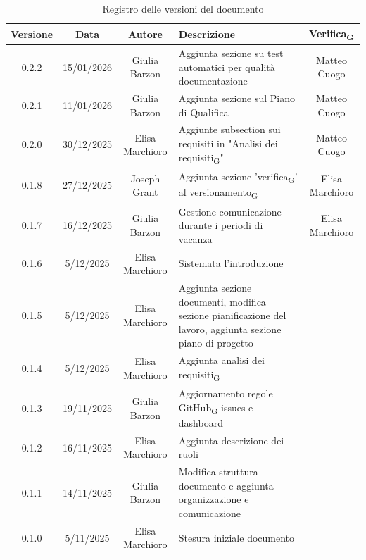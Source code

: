 \documentclass[11pt,a4paper]{article}
\newcommand{\gls}[1]{#1\textsubscript{G}}
\begin{document}
\begin{table}[H]
    \centering
    \begin{tabular}{|c|c|c|>{\raggedright\arraybackslash}p{}|c|}
        \hline
        \textbf{Versione} & \textbf{Data} & \textbf{Autore} & \textbf{Descrizione} & \textbf{\gls{Verifica}} \\
        \hline
        0.2.2 & 15/01/2026 & Giulia Barzon & Aggiunta sezione su test automatici per qualità documentazione & Matteo Cuogo\\
        \hline
        0.2.1 & 11/01/2026 & Giulia Barzon & Aggiunta sezione sul Piano di Qualifica & Matteo Cuogo\\
        \hline
        0.2.0 & 30/12/2025 & Elisa Marchioro & Aggiunte subsection sui requisiti in "\gls{Analisi dei requisiti}" & Matteo Cuogo\\ 
        \hline
        0.1.8 & 27/12/2025 & Joseph Grant & Aggiunta sezione '\gls{verifica}' al \gls{versionamento} & Elisa Marchioro\\ 
        \hline
        0.1.7 & 16/12/2025 & Giulia Barzon & Gestione comunicazione durante i periodi di vacanza & Elisa Marchioro\\
        \hline
        0.1.6 & 5/12/2025 & Elisa Marchioro & Sistemata l'introduzione & \\
        \hline
        0.1.5 & 5/12/2025 & Elisa Marchioro & Aggiunta sezione documenti, modifica sezione pianificazione del lavoro, aggiunta sezione piano di progetto & \\
        \hline
        0.1.4 & 5/12/2025 & Elisa Marchioro & Aggiunta \gls{analisi dei requisiti} & \\
        \hline
        0.1.3 & 19/11/2025 & Giulia Barzon & Aggiornamento regole \gls{GitHub} issues e dashboard & \\
        \hline
        0.1.2 & 16/11/2025 & Elisa Marchioro & Aggiunta descrizione dei ruoli & \\
        \hline
        0.1.1 & 14/11/2025 & Giulia Barzon & Modifica struttura documento e aggiunta organizzazione e comunicazione & \\
        \hline
        0.1.0 & 5/11/2025 & Elisa Marchioro & Stesura iniziale documento & \\
        \hline
    \end{tabular}
    \caption{Registro delle versioni del documento}
    \label{tab:versionamento}
\end{table}

\newpage
\end{document}
